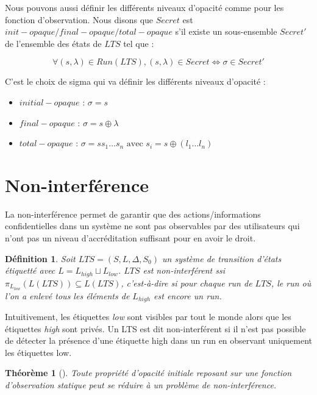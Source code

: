 \documentclass[10pt,a4paper]{article}
\newtheorem{mydef}{D\'efinition}
\newtheorem{myth}{Th\'eor\`eme}
\begin{document}
Nous pouvons aussi d\'efinir les diff\'erents niveaux d'opacit\'e comme pour les fonction d'observation. Nous disons que $Secret$ est $init-opaque/final-opaque/total-opaque$ s'il existe un sous-ensemble  $Secret'$ de l'ensemble des \'etats de $LTS$ tel que :

$$\forall (s,\lambda) \in Run(LTS), (s, \lambda) \in Secret \Leftrightarrow \sigma \in Secret'$$


C'est le choix de sigma qui va d\'efinir les diff\'erents niveaux d'opacit\'e :

\begin{itemize}
	\item $initial-opaque$ : $\sigma = s$
	\item $final-opaque$ : $\sigma = s\oplus \lambda$
	\item $total-opaque$ : $\sigma = s s_1 \dots s_n \mbox{ avec } s_i = s\oplus(l_1\dots l_n)$
\end{itemize} 

\section{Non-interf\'erence}

La non-interférence permet de garantir que des actions/informations  confidentielles dans un système ne sont pas observables par des utilisateurs qui n'ont pas un niveau d'accréditation suffisant pour en avoir le droit. 

\begin{mydef}
  Soit $LTS = (S,L,\Delta,S_0)$ un syst\`eme de transition d'\'etats \'etiquett\'e avec $L=L_{high}\sqcup L_{low}$. $LTS$ est non-interf\'erent ssi $\pi_{L_{low}}(L(LTS)) \subseteq L(LTS)$, c'est-\`a-dire si pour chaque run de $LTS$, le run o\`u l'on a enlev\'e tous les \'el\'ements de $L_{high}$ est encore un run.
\end{mydef}

Intuitivement, les étiquettes \emph{low} sont visibles par tout le monde alors que les étiquettes \emph{high} sont priv\'es. Un LTS est dit non-interf\'erent si il n'est pas possible de d\'etecter la pr\'esence d'une étiquette high dans un run en observant uniquement les étiquettes low.~\cite{GorrieriV10}

\begin{myth}[]
  Toute propri\'et\'e d'opacit\'e initiale reposant sur une fonction d'observation statique peut se r\'eduire \`a un probl\`eme  de non-interf\'erence.
  \label{opacity2noninterf}
\end{myth}
\end{document}
